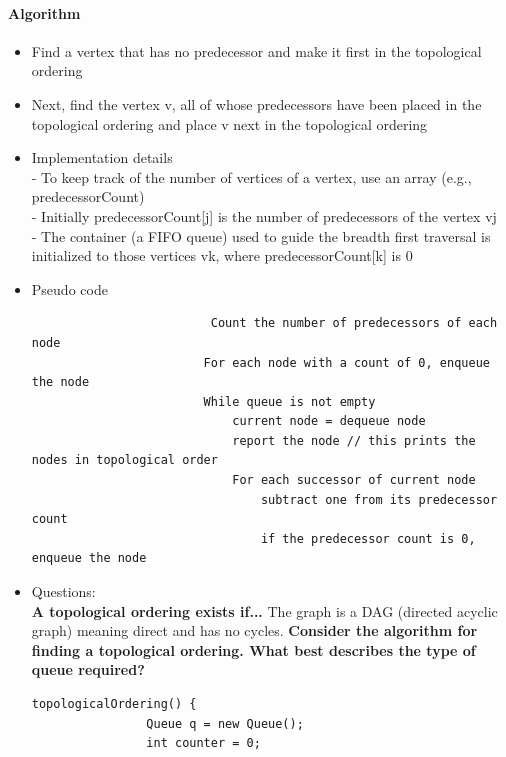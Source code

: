 \documentclass[10pt]{article}
\begin{document}
\paragraph{Algorithm}
\begin{itemize}
    \item Find a vertex that has no predecessor and make it first in the topological ordering
    \item Next, find the vertex v, all of whose predecessors have been placed in the topological ordering and place v next in the topological ordering \item Implementation details\\- To keep track of the number of vertices of a vertex, use an array (e.g., predecessorCount)\\- Initially predecessorCount[j] is the number of predecessors of the vertex vj\\- The container (a FIFO queue) used to guide the breadth first traversal is initialized to those vertices vk, where predecessorCount[k] is 0
    \item Pseudo code
          \begin{lstlisting}
                         Count the number of predecessors of each node
                        For each node with a count of 0, enqueue the node
                        While queue is not empty
                            current node = dequeue node
                            report the node // this prints the nodes in topological order
                            For each successor of current node
                                subtract one from its predecessor count
                                if the predecessor count is 0, enqueue the node
                    \end{lstlisting}
    \item Questions:\\
          \textbf{A topological ordering exists if...} The graph is a DAG (directed acyclic graph) meaning direct and has no cycles.
          \textbf{Consider the algorithm for finding a topological ordering. What best describes the type of queue required?}
          \begin{lstlisting}[style=java]
            topologicalOrdering() {
                Queue q = new Queue();
                int counter = 0;
             

\end{lstlisting}
\end{itemize}
\end{document}
